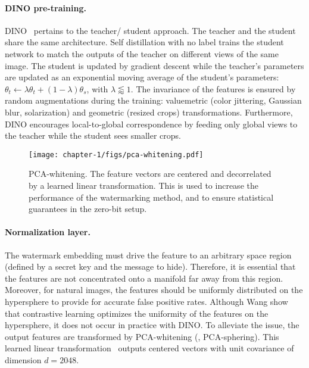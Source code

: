 \paragraph*{DINO pre-training.}
DINO~\citep{caron2021dino} pertains to the teacher/ student approach.
The teacher and the student share the same architecture.
Self distillation with no label trains the student network to match the outputs of the teacher
on different views of the same image. 
The student is updated by gradient descent while the teacher's parameters are updated as an exponential moving average of the student's parameters: $\theta_{t} \leftarrow \lambda \theta_{t} + (1-\lambda) \theta_{s}$, with $\lambda\lessapprox 1$.
The invariance of the features is ensured by random augmentations during the training: valuemetric (color jittering, Gaussian blur, solarization) and geometric (resized crops) transformations.
Furthermore, DINO encourages local-to-global correspondence by feeding only global views to the teacher while the student sees smaller crops. 


\begin{figure}[bh]
    \centering
    \texttt{[image: chapter-1/figs/pca-whitening.pdf]}
    \caption{
        PCA-whitening. 
        The feature vectors are centered and decorrelated by a learned linear transformation.
        This is used to increase the performance of the watermarking method, and to ensure statistical guarantees in the zero-bit setup.
    }
    \label{chap1/fig:whitening}
\end{figure}

\paragraph*{Normalization layer.}\label{chap1/par:whitening} 
The watermark embedding must drive the feature to an arbitrary space region (defined by a secret key and the message to hide).
Therefore, it is essential that the features are not concentrated onto a manifold far away from this region. 
Moreover, for natural images, the features should be uniformly distributed on the hypersphere to provide for accurate false positive rates.
Although Wang \etal\citep{wang2020uniformity} show that contrastive learning optimizes the uniformity of the features on the hypersphere, it does not occur in practice with DINO.
To alleviate the issue, the output features are transformed by PCA-whitening (\aka, PCA-sphering). 
This learned linear transformation~\citep{jegou2012negative} outputs centered vectors with unit covariance of dimension $d=2048$. 


